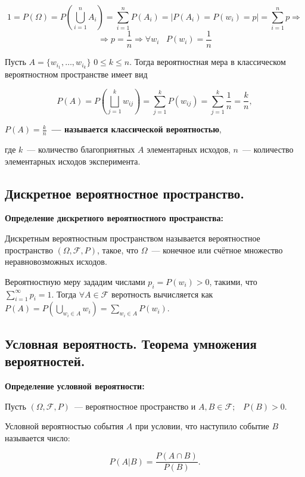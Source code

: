     \[
        1 = P(\Omega) = P(\bigcup^{n}_{i = 1} A_i) = \sum^{n}_{i = 1} P(A_i) =
        | P(A_i) = P(w_i) = p | = \sum^{n}_{i = 1} p \Rightarrow
    \]
    \[
        \Rightarrow p = \frac{1}{n} \Rightarrow \forall w_i \;\;\; P(w_i) =
        \frac{1}{n}  
    \]

    Пусть $A = \{w_{i_1}, \dots, w_{i_k}\}$ $0 \leq k \leq n$. Тогда
    вероятностная мера в классическом вероятностном пространстве имеет
    вид 

    \[
        P(A) = P \left( \bigsqcup^{k}_{j = 1} w_{ij} \right) =
        \sum^{k}_{j = 1} P(w_{ij}) = \sum^{k}_{j = 1} \frac{1}{n} = \frac{k}{n},  
    \]
    \bigskip

    \textbf{$P(A) = \frac{k}{n}$~--- называется классической вероятностью},

    где $k$~--- количество благоприятных $A$ элементарных исходов,
    $n$~--- количество элементарных исходов эксперимента.

\subsection{Дискретное вероятностное пространство.}

\textbf{Определение дискретного вероятностного пространства:}
    \smallskip

    Дискретным вероятностным пространством называется вероятностное
    пространство $(\Omega, \mathcal{F}, P)$, такое, что 
    $\Omega$~--- конечное или счётное множество неравновозможных исходов.
    \bigskip

    Вероятностную меру зададим числами $p_i = P(w_i) > 0$, такими, что
    $\sum^{\infty}_{i = 1} p_i = 1$. Тогда $\forall A \in \mathcal{F}$
    веротность вычисляется как $P(A) = P(\bigcup\limits_{w_i \in A} w_i) =
    \sum\limits_{w_i \in A} P (w_i)$.

\subsection{Условная вероятность. Теорема умножения вероятностей.}    

\textbf{Определение условной вероятности:}
    \smallskip

    Пусть $(\Omega, \mathcal{F}, P)$~--- вероятностное пространство и
    $A, B \in \mathcal{F}; \;\;\; P(B) > 0$. 

    Условной вероятностью события $A$ при условии, что наступило
    событие $B$ называется число:

    \[
        P(A|B) = \frac{P(A \cap B)}{P(B)}.  
    \]
    \bigskip

